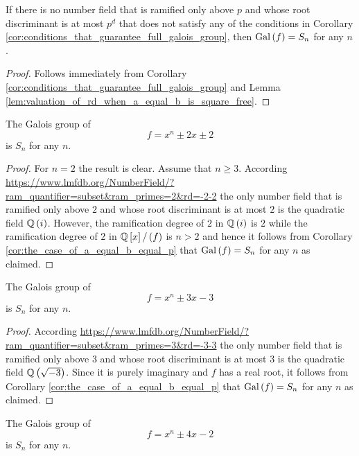 \documentclass[../main.tex]{subfiles}
\begin{document}
\begin{corollary}
  \label{cor:the_case_of_a_equal_b_equal_p}
  If there is no number field that is ramified only above $p$ and whose root discriminant is at most $p^d$ that does not satisfy any of the conditions in Corollary \ref{cor:conditions_that_guarantee_full_galois_group}, then $\operatorname{Gal}\left( f \right) = S_n$ for any $n$.
\end{corollary}
\begin{proof}
  Follows immediately from Corollary \ref{cor:conditions_that_guarantee_full_galois_group} and Lemma \ref{lem:valuation_of_rd_when_a_equal_b_is_square_free}.
\end{proof}

\begin{corollary}
  The Galois group of 
  \[
    f = x^n \pm 2x \pm 2
  \]
  is $S_n$ for any $n$.
\end{corollary}
\begin{proof}
  For $n = 2$ the result is clear.
  Assume that $n \geq 3$.
  According \url{https://www.lmfdb.org/NumberField/?ram_quantifier=subset&ram_primes=2&rd=-2-2} the only number field that is ramified only above $2$ and whose root discriminant is at most $2$ is the quadratic field $\mathbb{Q}\left( i \right)$.
  However, the ramification degree of $2$ in $\mathbb{Q}\left( i \right)$ is $2$ while the ramification degree of $2$ in $\mathbb{Q}\left[ x \right] / \left( f \right)$ is $n > 2$ and hence it follows from Corollary \ref{cor:the_case_of_a_equal_b_equal_p} that $\operatorname{Gal}\left( f \right) = S_n$ for any $n$ as claimed.
\end{proof}
\begin{corollary}
  The Galois group of 
  \[
    f = x^n \pm 3x - 3
  \]
  is $S_n$ for any $n$.
\end{corollary}
\begin{proof}
  According \url{https://www.lmfdb.org/NumberField/?ram_quantifier=subset&ram_primes=3&rd=-3-3} the only number field that is ramified only above $3$ and whose root discriminant is at most $3$ is the quadratic field $\mathbb{Q}\left( \sqrt{-3} \right)$.
  Since it is purely imaginary and $f$ has a real root, it follows from Corollary \ref{cor:the_case_of_a_equal_b_equal_p} that $\operatorname{Gal}\left( f \right) = S_n$ for any $n$ as claimed.
\end{proof}
\begin{corollary}
  The Galois group of 
  \[
    f = x^n \pm 4x - 2
  \]
  is $S_n$ for any $n$.
\end{corollary}
\end{document}
